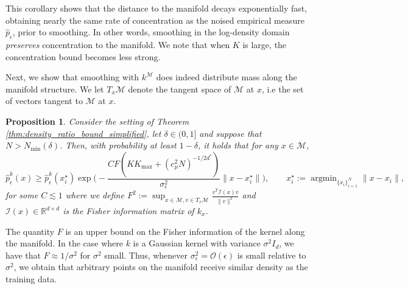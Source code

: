 \documentclass[10pt]{article}
\theoremstyle{plain}
\newtheorem{proposition}[theorem]{Proposition}
\theoremstyle{definition}
\theoremstyle{remark}
\newcommand{\M}{{\mathcal{M}}}
\newcommand{\R}{\mathbb{R}}
\begin{document}
This corollary shows that the distance to the manifold decays exponentially fast, obtaining nearly the same rate of concentration as the noised empirical measure \(\hat{p}_\epsilon\), prior to smoothing. In other words, smoothing in the log-density domain \textit{preserves} concentration to the manifold. We note that when \(K\) is large, the concentration bound becomes less strong.

Next, we show that smoothing with $k^\M$ does indeed distribute mass along the manifold structure. We let \(T_x \M\) denote the tangent space of \(\M\) at \(x\), i.e the set of vectors tangent to \(\M\) at \(x\).
\begin{proposition}
\label{prop:distributed_on_manifold}
Consider the setting of Theorem \ref{thm:density_ratio_bound_simplified}, let \(\delta \in (0, 1]\) and suppose that \(N > N_{\min}(\delta)\). Then, with probability at least \(1-\delta\), it holds that for any \(x \in \M\),
\begin{equation*}
     \hat{p}^{k}_\epsilon(x) \geq \hat{p}^{k}_\epsilon(x_i^\star) \exp \bigg ( - \frac{C F (K K_{\max} + (c_\mu^2 N)^{-1/2d^*})}{\sigma_\epsilon^{2}}  \|x - x_i^\star\| \bigg ), \qquad x_i^\star := \operatorname{argmin}_{\{x_i\}_{i=1}^N} \|x - x_i\|,
\end{equation*}
for some \(C \lesssim 1\) where we define \(F^2 := \sup_{x \in \M, v \in T_x \M} \frac{v^T \mathcal{I}(x) v}{\|v\|^2}\) and \(\mathcal{I}(x) \in \R^{d \times d}\) is the Fisher information matrix of \(k_x\).
\end{proposition}
The quantity \(F\) is an upper bound on the Fisher information of the kernel along the manifold. In the case where \(k\) is a Gaussian kernel with variance \(\sigma^2 I_d\), we have that \(F \approx 1/\sigma^2\) for \(\sigma^2\) small. Thus, whenever \(\sigma_\epsilon^2 = \mathcal{O}(\epsilon)\) is small relative to \(\sigma^2\), we obtain that arbitrary points on the manifold receive similar density as the training data.
\end{document}
